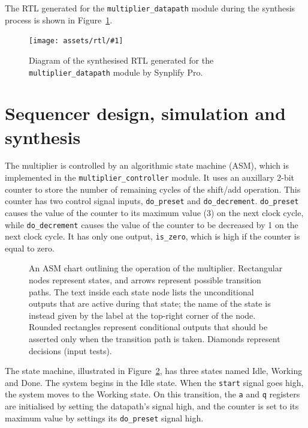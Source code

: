 \documentclass[a4paper]{article}
\newcommand{\rtlfigure}[2]{
  \begin{figure}[tp]
    \centering\texttt{[image: assets/rtl/\#1]}
    \caption{#2}
    \label{fig:rtl:#1}
  \end{figure}
}
\begin{document}
The RTL generated for the \texttt{multiplier\_datapath} module during the synthesis process is shown in Figure~\ref{fig:rtl:multiplier_datapath}.

\rtlfigure{multiplier_datapath}{Diagram of the synthesised RTL generated for the \texttt{multiplier\_datapath} module by Synplify Pro.}

\section{Sequencer design, simulation and synthesis}
\label{sec:seq}

The multiplier is controlled by an algorithmic state machine (ASM), which is implemented in the \texttt{multiplier\_controller} module. It uses an auxillary 2-bit counter to store the number of remaining cycles of the shift/add operation. This counter has two control signal inputs, \texttt{do\_preset} and \texttt{do\_decrement}. \texttt{do\_preset} causes the value of the counter to its maximum value (3) on the next clock cycle, while \texttt{do\_decrement} causes the value of the counter to be decreased by 1 on the next clock cycle. It has only one output, \texttt{is\_zero}, which is high if the counter is equal to zero.

\begin{figure}[tp]
  \centering
  
  \caption{An ASM chart outlining the operation of the multiplier. Rectangular nodes represent states, and arrows represent possible transition paths. The text inside each state node lists the unconditional outputs that are active during that state; the name of the state is instead given by the label at the top-right corner of the node. Rounded rectangles represent conditional outputs that should be asserted only when the transition path is taken. Diamonds represent decisions (input tests).}
  \label{fig:asm}
\end{figure}

The state machine, illustrated in Figure~\ref{fig:asm}, has three states named Idle, Working and Done. The system begins in the Idle state. When the \texttt{start} signal goes high, the system moves to the Working state. On this transition, the \texttt{a} and \texttt{q} registers are initialised by setting the datapath's  signal high, and the counter is set to its maximum value by settings its \texttt{do\_preset} signal high.
\end{document}
